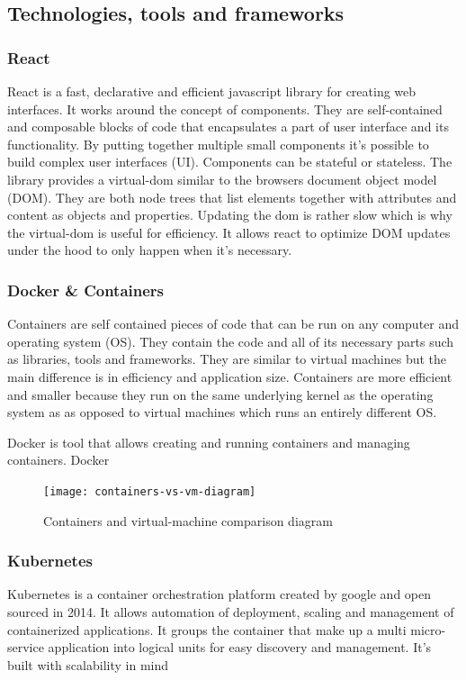 \subsection{Technologies, tools and frameworks}
\subsubsection{React}
React is a fast, declarative and efficient javascript library for creating web interfaces. It works around the concept of components. They are self-contained and composable blocks of code that encapsulates a part of user interface and its functionality. By putting together multiple small components it's possible to build complex user interfaces (UI). Components can be stateful or stateless.
The library provides a virtual-dom similar to the browsers document object model (DOM). They are both node trees that list elements together with attributes and content as objects and properties. Updating the dom is rather slow which is why the virtual-dom is useful for efficiency. It allows react to optimize DOM updates under the hood to only happen when it's necessary.
\subsubsection{Docker \& Containers}
Containers are self contained pieces of code that can be run on any computer and operating system (OS). They contain the code and all of its necessary parts such as libraries, tools and frameworks. They are similar to virtual machines but the main difference is in efficiency and application size. Containers are more efficient and smaller because they run on the same underlying kernel as the operating system as as opposed to virtual machines which runs an entirely different OS.

Docker is tool that allows creating and running containers and managing containers. 
Docker

\begin{figure}[h!]
    \texttt{[image: containers-vs-vm-diagram]}
    \caption{Containers and virtual-machine comparison diagram}
\end{figure}

\subsubsection{Kubernetes}
Kubernetes is a container orchestration platform created by google and open sourced in 2014. It allows automation of deployment, scaling and management of containerized applications. It groups the container that make up a multi micro-service application into logical units for easy discovery and management. It's built with scalability in mind 

